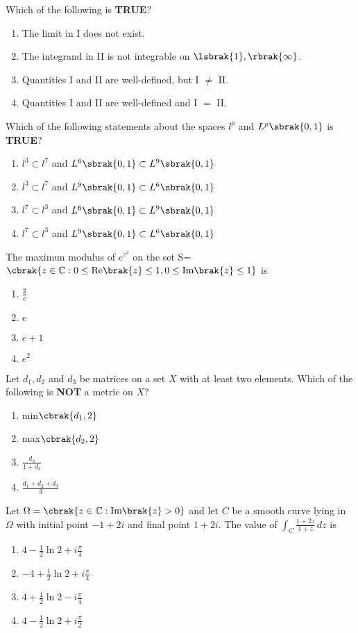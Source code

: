 Which of the following is \textbf{TRUE}?
\begin{enumerate}
    \item The limit in I does not exist.
    \item The integrand in II is not integrable on $\lsbrak{1}, \rbrak{\infty}$.
    \item Quantities I and II are well-defined, but I $\neq$ II.
    \item Quantities I and II are well-defined and I $=$ II.
\end{enumerate}
\item Which of the following statements about the spaces $l^p$ and $L^p\sbrak{0, 1}$ is \textbf{TRUE}?
\begin{enumerate}
    \item $l^3 \subset l^7$ and $L^6\sbrak{0, 1} \subset L^9\sbrak{0, 1}$
    \item $l^3 \subset l^7$ and $L^9\sbrak{0, 1} \subset L^6\sbrak{0, 1}$
    \item $l^7 \subset l^3$ and $L^6\sbrak{0, 1} \subset L^9\sbrak{0, 1}$
    \item $l^7 \subset l^3$ and $L^9\sbrak{0, 1} \subset L^6\sbrak{0, 1}$
\end{enumerate}
\item The maximun modulus of $e^{z^2}$ on the set S=$\cbrak{ z \in \mathbb{C} : 0 \leq \text{Re}\brak{z} \leq 1, 0 \leq \text{Im}\brak{z} \leq 1}$ is
\begin{enumerate}
    \item $\frac{2}{e}$
    \item $e$
    \item $e+1$
    \item $e^2$
\end{enumerate}
\item Let $d_1, d_2$ and $d_3$ be matrices on a set $X$ with at least two elements. Which of the following is \textbf{NOT} a metric on $X$?
\begin{enumerate}
    \item min$\cbrak{d_1, 2}$
    \item max$\cbrak{d_2, 2}$
    \item $\frac{d_3}{1+d_3}$
    \item $\frac{d_1+d_2+d_3}{3}$
\end{enumerate}
\item Let $\Omega = \cbrak{ z \in \mathbb{C} : \text{Im}\brak{z} > 0 }$ and let $C$ be a smooth curve lying in $\Omega$ with initial point $-1 + 2i$ and final point $1 + 2i$. The value of $\int_C \frac{1 + 2z}{1 + z} \, dz$ is
\begin{enumerate}
    \item $4 - \frac{1}{2} \ln 2 + i \frac{\pi}{4}$
    \item $-4 + \frac{1}{2} \ln 2 + i \frac{\pi}{4}$
    \item $4 + \frac{1}{2} \ln 2 - i \frac{\pi}{4}$
    \item $4 - \frac{1}{2} \ln 2 + i \frac{\pi}{2}$
\end{enumerate}

